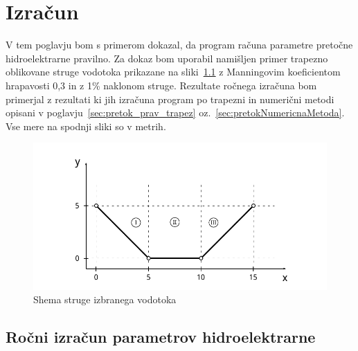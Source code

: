 \chapter{Izračun}


V tem poglavju bom s primerom dokazal, da program računa parametre pretočne hidroelektrarne pravilno. Za dokaz bom uporabil namišljen primer trapezno oblikovane struge vodotoka prikazane na sliki~\ref{fig:izracun_trapeznaStruga} z Manningovim koeficientom hrapavosti 0,3 in z 1\% naklonom struge. Rezultate ročnega izračuna bom primerjal z rezultati ki jih izračuna program po trapezni in numerični metodi opisani v poglavju~\ref{sec:pretok_prav_trapez}  oz.~\ref{sec:pretokNumericnaMetoda}. Vse mere na spodnji sliki so v metrih.



\begin{figure}[ht!]
	\begin{centering}
		\includegraphics[width=\textwidth]{slike/izracuni/trapeznaStruga.pdf}		
		\caption{Shema struge izbranega vodotoka}\label{fig:izracun_trapeznaStruga}
	\end{centering}
\end{figure}

\section{Ročni izračun parametrov hidroelektrarne}

